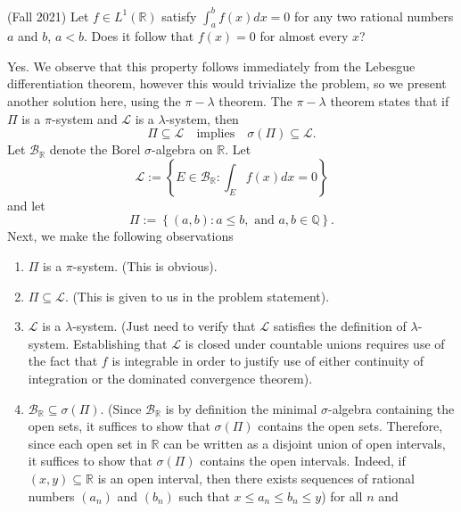 \documentclass[answers]{exam}
\theoremstyle{problemstyle}
\newcommand{\1}[1]{\textbf{1}_{\left[#1\right]}} %
\begin{document}
\begin{questions}
\question (Fall 2021) Let $f\in L^{1}(\mathbb{R})$  satisfy $\int_{a}^{b}f(x)dx=0$
for any two rational numbers $a$ and $b$, $a<b$. Does it follow that $f(x)=0$
for almost every $x$?

\begin{solution} Yes. We observe that this property follows immediately from the Lebesgue
differentiation theorem, however this would trivialize the problem, so we
present another solution here, using the $\pi-\lambda$ theorem. The
$\pi-\lambda$ theorem states that if $\Pi$ is a $\pi$-system and $\mathcal{L}$
is a $\lambda$-system, then
\begin{equation*}
  \Pi\subseteq \mathcal{L}
  \quad \text{implies} \quad
  \sigma(\Pi) \subseteq \mathcal{L}.
\end{equation*}
Let $\mathcal{B}_{\mathbb{R}}$ denote the Borel $\sigma$-algebra on
$\mathbb{R}$. Let
\begin{equation*}
  \mathcal{L} 
  := \left\{ E \in  \mathcal{B}_{\mathbb{R}} :  \int_{E}f(x)dx  = 0 \right\}
\end{equation*}
and let 
\begin{equation*}
  \Pi := \left\{(a,b):a \leq b, \text{ and } a,b\in \mathbb{Q}\right\}.
\end{equation*}
Next, we make the following observations
\begin{enumerate}
  \item $\Pi$ is a $\pi$-system. (This is obvious).
  \item $\Pi\subseteq \mathcal{L}$. (This is given to us in the problem
  statement).
  \item $\mathcal{L}$ is a $\lambda$-system. (Just need to verify that
  $\mathcal{L}$ satisfies the definition of $\lambda$-system. Establishing that
  $\mathcal{L}$ is closed under countable unions requires use of the fact that
  $f$ is integrable in order to justify use of either continuity of integration
  or the dominated convergence theorem).
  \item $  \mathcal{B}_{\mathbb{R}}\subseteq \sigma(\Pi)$. (Since
  $\mathcal{B}_{\mathbb{R}}$ is by definition the minimal $\sigma$-algebra
  containing the open sets, it suffices to show that $\sigma(\Pi)$ contains the
  open sets. Therefore, since each open set in $\mathbb{R}$ can be written as a
  disjoint union of open intervals, it suffices to show that $\sigma(\Pi)$
  contains the open intervals. Indeed, if $(x,y)\subseteq \mathbb{R}$ is an open
  interval, then there exists sequences of rational numbers $(a_{n})$ and
  $(b_{n})$ such that $x\leq a_{n}\leq b_{n}\leq y$) for all $n$ and

\end{enumerate}
\end{solution}
\end{questions}
\end{document}
